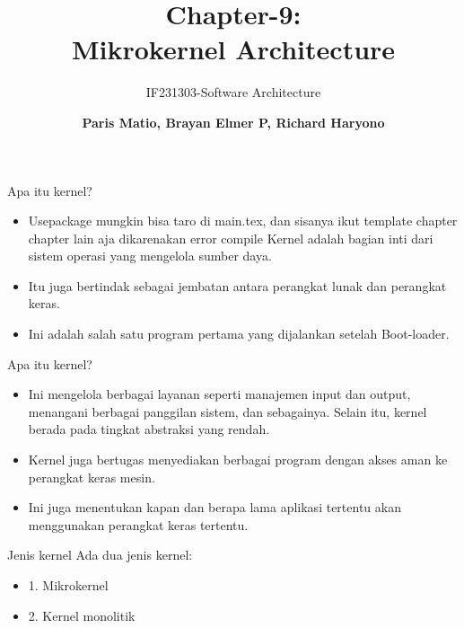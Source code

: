 \documentclass[aspectratio=169, table]{beamer}
\subtitle{IF231303-Software Architecture}
\title{\huge Chapter-9:\\Mikrokernel Architecture}
\author[Pradita]{\small {\textbf{Paris Matio, Brayan Elmer P, Richard Haryono}}}
\begin{document}
	\begin{frame}[plain]
		\maketitle
	\end{frame}

	\begin{frame}{Apa itu kernel?}
		\begin{itemize}
			\item Usepackage mungkin bisa taro di main.tex, dan sisanya ikut template chapter chapter lain aja dikarenakan error compile
			Kernel adalah bagian inti dari sistem operasi yang mengelola sumber daya.


			\item Itu juga bertindak sebagai jembatan antara perangkat lunak dan perangkat keras.

			\item Ini adalah salah satu program pertama yang dijalankan setelah Boot-loader.


		\end{itemize}
	\end{frame}


	\begin{frame}{Apa itu kernel?}
	\begin{itemize}


		\item Ini mengelola berbagai layanan seperti manajemen input dan output, menangani berbagai panggilan sistem, dan sebagainya. Selain itu, kernel berada pada tingkat abstraksi yang rendah.

		\item Kernel juga bertugas menyediakan berbagai program dengan akses aman ke perangkat keras mesin.

		\item Ini juga menentukan kapan dan berapa lama aplikasi tertentu akan menggunakan perangkat keras tertentu.
	\end{itemize}
\end{frame}

	\begin{frame}{Jenis kernel}
		Ada dua jenis kernel:
		\begin{itemize}
			\item 	1. Mikrokernel
			\item	2. Kernel monolitik
		\end{itemize}

	\end{frame}
\end{document}
